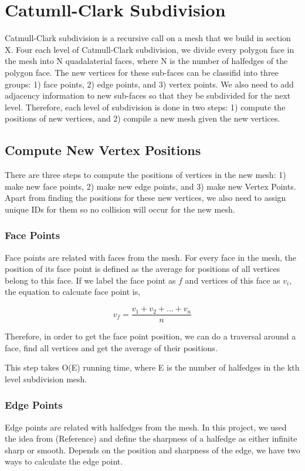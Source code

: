 \documentclass[12pt]{article}
\begin{document}
\section{Catumll-Clark Subdivision} \label{sec:ccsd}

Catmull-Clark subdivision is a recursive call on a mesh that we build in section X. Four each level of Catmull-Clark subdivision, we divide every polygon face in the mesh into N quadalaterial faces, where N is the number of halfedges of the polygon face. The new vertices for these sub-faces can be classifid into three groups: 1) face points, 2) edge points, and 3) vertex points. We also need to add adjacency information to new sub-faces so that they be subdivided for the next level. Therefore, each level of subdivision is done in two steps: 1) compute the positions of new vertices, and 2) compile a new mesh given the new vertices.

\subsection{Compute New Vertex Positions}
There are three steps to compute the positions of vertices in the new mesh: 1) make new face points, 2) make new edge points, and 3) make new Vertex Points. Apart from finding the positions for these new vertices, we also need to assign unique IDs for them so no collision will occur for the new mesh.

\subsubsection{Face Points}
Face points are related with faces from the mesh. For every face in the mesh, the position of its face point is defined as the average for positions of all vertices belong to this face. If we label the face point as $f$ and vertices of this face as $v_i$, the equation to calcuate face point is,

$$v_f = \frac{v_1 + v_2 + ... + v_n}{n}$$

Therefore, in order to get the face point position, we can do a traversal around a face, find all vertices and get the average of their positions.

This step takes O(E) running time, where E is the number of halfedges in the kth level subdivision mesh.

\subsubsection{Edge Points}
Edge points are related with halfedges from the mesh. In this project, we used the idea from (Reference) and define the sharpness of a halfedge as either infinite sharp or smooth. Depends on the position and sharpness of the edge, we have two ways to calculate the edge point. 
\end{document}
